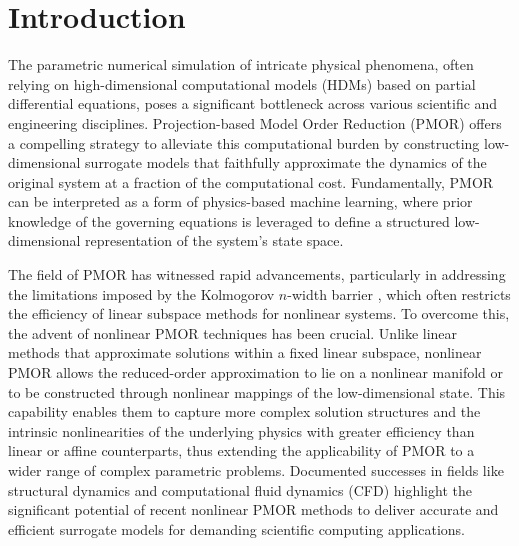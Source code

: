 \documentclass[preprint,10pt]{elsarticle}
\begin{document}

\section{Introduction}
\label{sec:Intro}

The parametric numerical simulation of intricate physical phenomena, often relying on high-dimensional computational models (HDMs) based on partial differential equations, poses a 
significant bottleneck across various scientific and engineering disciplines. Projection-based Model Order Reduction (PMOR) \cite{antoulas2005approximation} offers a compelling 
strategy to alleviate this computational burden by constructing low-dimensional surrogate models that faithfully approximate the dynamics of the original system at a fraction of the
computational cost.  Fundamentally, PMOR can be interpreted as a form of physics-based machine learning, where prior knowledge of the governing equations is leveraged to define a 
structured low-dimensional representation of the system's state space.

The field of PMOR has witnessed rapid advancements, particularly in addressing the limitations imposed by the Kolmogorov $n$-width barrier \cite{quarteroni2014reduced}, which often 
restricts the efficiency of linear subspace methods for nonlinear systems. To overcome this, the advent of nonlinear PMOR techniques has been crucial. Unlike linear methods that 
approximate solutions within a fixed linear subspace, nonlinear PMOR allows the reduced-order approximation to lie on a nonlinear manifold or to be constructed through nonlinear 
mappings of the low-dimensional state. This capability enables them to capture more complex solution structures and the intrinsic nonlinearities of the underlying physics with greater
efficiency than linear or affine counterparts, thus extending the applicability of PMOR to a wider range of complex parametric problems.  Documented successes in fields like 
structural dynamics \cite{he2020situ} and computational fluid dynamics (CFD) \cite{chmiel2025unified} highlight the significant potential of recent nonlinear PMOR methods to deliver 
accurate and efficient surrogate models for demanding scientific computing applications.
\end{document}
